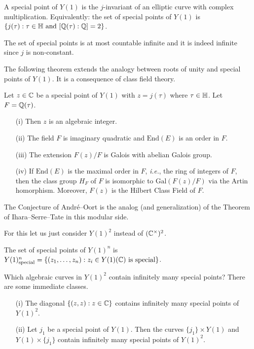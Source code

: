 \begin{definition}
  \label{def:specialY1}
  A special point of $Y(1)$ is the $j$-invariant of an elliptic curve
  with complex multiplication. Equivalently: the set of special points
  of $Y(1)$ is $\{j(\tau) : \tau\in{\mathbb{H}} \text{ and }[{\mathbb{Q}}(\tau):{\mathbb{Q}}]=2\}$. 
\end{definition}

The set of special points is at most countable infinite and it is
indeed infinite since $j$ is non-constant.

The following theorem extends the analogy between roots of unity and
special points of $Y(1)$. It is a consequence of class field theory. 
\begin{theorem}
  \label{thm:galoisspecial}
  Let $z\in {\mathbb{C}}$ be a special point of $Y(1)$ with $z=j(\tau)$ where
  $\tau\in {\mathbb{H}}$. Let $F={\mathbb{Q}}(\tau)$.
  \begin{enumerate}
  \item [(i)] Then $z$ is an algebraic integer.
  \item[(ii)] The field $F$ is
    imaginary quadratic and   $\mathrm{End}(E)$ is an order
    in $F$.
  \item[(iii)] The extension $F(z)/F$ is Galois with abelian Galois
    group.
  \item[(iv)] If $\mathrm{End}(E)$ is the maximal order in $F$,
    \textit{i.e.}, the ring of integers of $F$, then
    the class group $H_F$ of $F$ is isomorphic to
    $\mathrm{Gal}(F(z)/F)$ via the Artin homorphism.
    Moreover, $F(z)$ is the Hilbert Class Field of $F$. 
  \end{enumerate}
\end{theorem}

The Conjecture of Andr\'e--Oort is the analog (and generalization) of
the Theorem of Ihara--Serre--Tate in this modular side.

For this let us just consider $Y(1)^2$ instead of $({\mathbb{C}}^\times)^2$.
\begin{definition}
  The set of special points of  $Y(1)^n$ is $Y(1)^n_{\mathrm{special}}=\{(z_1,\ldots,z_n) :
  z_i\in Y(1)({\mathbb{C}})\text{ is special} \}$. 
\end{definition}

Which algebraic curves in $Y(1)^2$ contain infinitely many special
points? There are some immediate classes.

\begin{example}
  \begin{enumerate}
  \item[(i)] The diagonal  $\{(z,z) : z\in{\mathbb{C}}\}$ contains infinitely
    many special points of $Y(1)^2$. 
  \item [(ii)]  Let $j_1$ be a special point of $Y(1)$.  Then the curves
    $\{j_1\}\times Y(1)$ and $Y(1)\times \{j_1\}$ contain infinitely many
    special points of $Y(1)^2$. 
  \end{enumerate}
\end{example}

